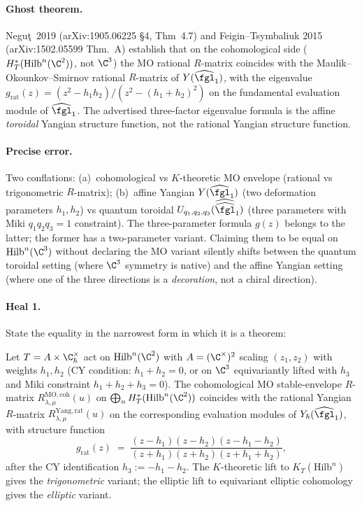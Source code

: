 \paragraph{Ghost theorem.}  Negu\c t~2019 (arXiv:1905.06225 \S4, Thm~4.7)
and Feigin--Tsymbaliuk 2015 (arXiv:1502.05599 Thm.~A) establish that
on the cohomological side ($H^*_T(\mathrm{Hilb}^n(\C^2))$, not $\C^3$)
the MO rational $R$-matrix coincides with the Maulik--Okounkov--Smirnov
rational $R$-matrix of $Y(\widehat{\fgl}_1)$, with the eigenvalue
$g_{\mathrm{rat}}(z) = (z^2 - h_1 h_2)/(z^2 - (h_1 + h_2)^2)$ on the
fundamental evaluation module of $\widehat{\fgl}_1$.  The advertised
three-factor eigenvalue formula is the affine \emph{toroidal} Yangian
structure function, not the rational Yangian structure function.

\paragraph{Precise error.}  Two conflations:
(a)~cohomological vs $K$-theoretic MO envelope (rational vs
trigonometric $R$-matrix);
(b)~affine Yangian $Y(\widehat{\fgl}_1)$ (two deformation parameters
$h_1, h_2$) vs quantum toroidal $U_{q_1, q_2, q_3}(\widehat{\widehat{\fgl}}_1)$
(three parameters with Miki $q_1 q_2 q_3 = 1$ constraint).
The three-parameter formula $g(z)$ belongs to the latter; the former
has a two-parameter variant.  Claiming them to be equal on
$\mathrm{Hilb}^n(\C^3)$ without declaring the MO variant silently
shifts between the quantum toroidal setting (where $\C^3$ symmetry is
native) and the affine Yangian setting (where one of the three
directions is a \emph{decoration}, not a chiral direction).

\paragraph{Heal 1.}  State the equality in the narrowest form in which
it is a theorem:
\begin{theorem}
\label{thm:MO-E2-heal-rational}
Let $T = A\times\C^\times_\hbar$ act on $\mathrm{Hilb}^n(\C^2)$ with
$A = (\C^\times)^2$ scaling $(z_1, z_2)$ with weights $h_1, h_2$
(CY condition: $h_1 + h_2 = 0$, or on $\C^3$ equivariantly lifted
with $h_3$ and Miki constraint $h_1 + h_2 + h_3 = 0$).
The cohomological MO stable-envelope $R$-matrix
$R^{\mathrm{MO,coh}}_{\lambda,\mu}(u)$ on
$\bigoplus_n H^*_T(\mathrm{Hilb}^n(\C^2))$ coincides with the
rational Yangian $R$-matrix $R^{\mathrm{Yang,rat}}_{\lambda,\mu}(u)$
on the corresponding evaluation modules of $Y_\hbar(\widehat{\fgl}_1)$,
with structure function
\[
g_{\mathrm{rat}}(z)\;=\;\frac{(z - h_1)(z - h_2)(z - h_1 - h_2)}
 {(z + h_1)(z + h_2)(z + h_1 + h_2)},
\]
after the CY identification $h_3 := -h_1 - h_2$.  The
$K$-theoretic lift to $K_T(\mathrm{Hilb}^n)$ gives the
\emph{trigonometric} variant; the elliptic lift to equivariant
elliptic cohomology gives the \emph{elliptic} variant.
\end{theorem}

